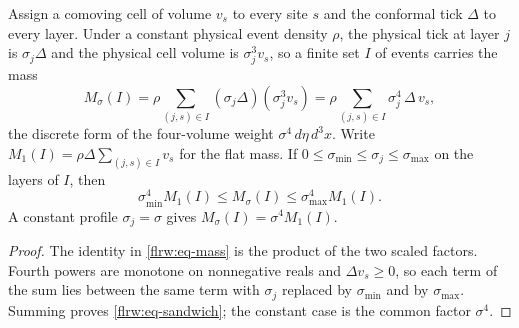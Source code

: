 \begin{proposition}
\label{flrw:count-measure}
Assign a comoving cell of volume $v_s$ to every site $s$ and the conformal
tick $\Delta$ to every layer. Under a constant physical event density
$\rho$, the physical tick at layer $j$ is $\sigma_j\Delta$ and the physical
cell volume is $\sigma_j^3v_s$, so a finite set $I$ of events carries the
mass
\begin{equation}
 M_\sigma(I)=\rho\sum_{(j,s)\in I}(\sigma_j\Delta)(\sigma_j^3v_s)
 =\rho\sum_{(j,s)\in I}\sigma_j^4\,\Delta\,v_s,
 \label{flrw:eq-mass}
\end{equation}
the discrete form of the four-volume weight $\sigma^4\,d\eta\,d^3x$. Write
$M_1(I)=\rho\Delta\sum_{(j,s)\in I}v_s$ for the flat mass. If
$0\le\sigma_{\min}\le\sigma_j\le\sigma_{\max}$ on the layers of $I$, then
\begin{equation}
 \sigma_{\min}^4M_1(I)\le M_\sigma(I)\le\sigma_{\max}^4M_1(I).
 \label{flrw:eq-sandwich}
\end{equation}
A constant profile $\sigma_j=\sigma$ gives $M_\sigma(I)=\sigma^4M_1(I)$.
\end{proposition}
\begin{proof}
The identity in \eqref{flrw:eq-mass} is the product of the two scaled
factors. Fourth powers are monotone on nonnegative reals and
$\Delta v_s\ge0$, so each term of the sum lies between the same term with
$\sigma_j$ replaced by $\sigma_{\min}$ and by $\sigma_{\max}$. Summing
proves \eqref{flrw:eq-sandwich}; the constant case is the common factor
$\sigma^4$.
\end{proof}

